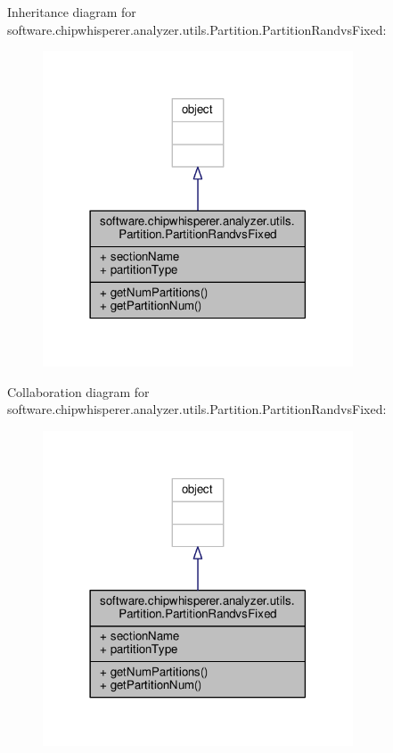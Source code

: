 Inheritance diagram for software.\+chipwhisperer.\+analyzer.\+utils.\+Partition.\+Partition\+Randvs\+Fixed\+:\nopagebreak
\begin{figure}[H]
\begin{center}
\leavevmode
\includegraphics[width=261pt]{db/d56/classsoftware_1_1chipwhisperer_1_1analyzer_1_1utils_1_1Partition_1_1PartitionRandvsFixed__inherit__graph}
\end{center}
\end{figure}


Collaboration diagram for software.\+chipwhisperer.\+analyzer.\+utils.\+Partition.\+Partition\+Randvs\+Fixed\+:\nopagebreak
\begin{figure}[H]
\begin{center}
\leavevmode
\includegraphics[width=261pt]{d1/db0/classsoftware_1_1chipwhisperer_1_1analyzer_1_1utils_1_1Partition_1_1PartitionRandvsFixed__coll__graph}
\end{center}
\end{figure}


